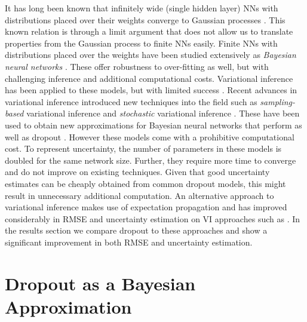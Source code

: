 \documentclass{article}
\theoremstyle{definition}
\begin{document}
It has long been known that infinitely wide (single hidden layer) NNs with distributions placed over their weights converge to Gaussian processes \citep{neal1995bayesian,williams1997computing}. 
This known relation is through a limit argument that does not allow us to translate properties from the Gaussian process to finite NNs easily. 
Finite NNs with distributions placed over the weights have been studied extensively as \textit{Bayesian neural networks} \citep{neal1995bayesian,mackay1992practical}. These offer robustness to over-fitting as well, but with challenging inference and additional computational costs. Variational inference has been applied to these models, but with limited success \citep{hinton1993keeping, barber1998ensemble, graves2011practical}. 
Recent advances in variational inference introduced new techniques into the field such as \textit{sampling-based} variational inference and \textit{stochastic} variational inference \citep{blei2012variational,kingma2013auto,
rezende2014stochastic,titsias2014doubly,
hoffman2013stochastic}. These have been used to obtain new approximations for Bayesian neural networks that perform as well as dropout \citep{blundell2015weight}. However these models come with a prohibitive computational cost. To represent uncertainty, the number of parameters in these models is doubled for the same network size. Further, they require more time to converge and do not improve on existing techniques. Given that good uncertainty estimates can be cheaply obtained from common dropout models, this might result in unnecessary additional computation. An alternative approach to variational inference makes use of expectation propagation \citep{hernandez2015probabilistic} and has improved considerably in RMSE and uncertainty estimation on VI approaches such as \citep{graves2011practical}. In the results section we compare dropout to these approaches and show a significant improvement in both RMSE and uncertainty estimation.

\section{Dropout as a Bayesian Approximation}
\end{document}
